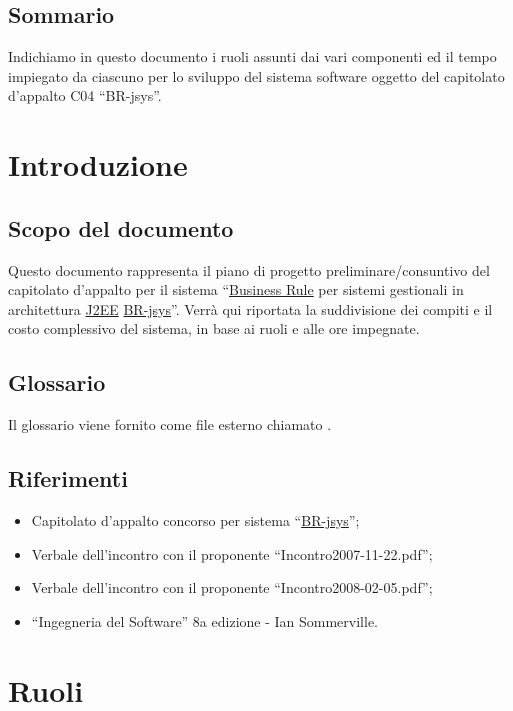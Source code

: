 \section {Sommario}
Indichiamo in questo documento i ruoli assunti dai vari componenti ed il tempo impiegato da ciascuno per lo sviluppo del sistema software oggetto del capitolato d'appalto C04 ``BR-jsys''.
\tableofcontents 


\chapter{Introduzione}
\section{Scopo del documento}
Questo documento rappresenta il piano di progetto preliminare/consuntivo del capitolato d'appalto per il sistema ``\underline{Business Rule} per sistemi gestionali in architettura \underline{J2EE} \underline{BR-jsys}''. Verr\`a qui riportata la suddivisione dei compiti e il costo complessivo del sistema, in base ai ruoli e alle ore impegnate.

\section{Glossario}
Il glossario viene fornito come file esterno chiamato \Glossario .

\section{Riferimenti}
\begin{itemize}
\item Capitolato d'appalto concorso per sistema ``\underline{BR-jsys}'';
\item Verbale dell'incontro con il proponente ``Incontro2007-11-22.pdf'';
\item Verbale dell'incontro con il proponente ``Incontro2008-02-05.pdf'';
\item ``Ingegneria del Software'' 8a edizione - Ian Sommerville.
\end{itemize}

\chapter{Ruoli}
